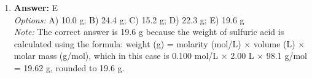 \documentclass[12pt]{article}
\begin{document}
\begin{enumerate}[label=\arabic*.]
\\ \textit{Note:} The correct answer reflects the colligative properties of the solution, where the addition of urea lowers the freezing point and raises the boiling point of water due to the solute's effect on vapor pressure and the formation of a solution, resulting in a boiling point of 101.00°C and a freezing point of 1.55°C.
\item \textbf{Answer:} E
\\ \textit{Options:} A) 10.0 g; B) 24.4 g; C) 15.2 g; D) 22.3 g; E) 19.6 g
\\ \textit{Note:} The correct answer is 19.6 g because the weight of sulfuric acid is calculated using the formula: weight (g) = molarity (mol/L) × volume (L) × molar mass (g/mol), which in this case is 0.100 mol/L × 2.00 L × 98.1 g/mol = 19.62 g, rounded to 19.6 g.
\end{enumerate}
\end{document}
